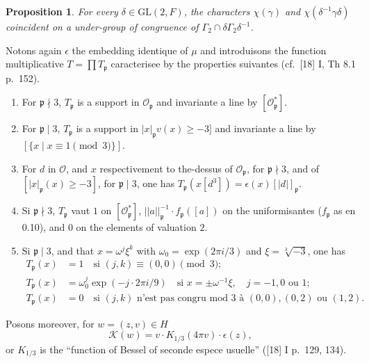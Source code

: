 \documentclass[12pt,a4paper]{article}
\theoremstyle{plain}
\newtheorem{proposition}[theorem]{Proposition}
\theoremstyle{definition}
\theoremstyle{remark}
\newcommand{\cO}{\mathcal{O}}
\newcommand{\frakp}{\mathfrak{p}}
\providecommand{\cO}{\mathcal{O}}
\providecommand{\frakp}{\mathfrak{p}}
\begin{document}
\begin{proposition}
For every $\delta \in \mathrm{GL}(2, F)$, the characters $\chi(\gamma)$ and $\chi(\delta^{-1}\gamma\delta)$ coincident on a under-group of congruence of $\Gamma_2 \cap \delta\Gamma_2\delta^{-1}$.
\end{proposition}

Notons again $\epsilon$ the embedding identique of $\mu$ and introduisons the function multiplicative $T = \prod T_\frakp$ caracterisee by the properties suivantes (cf.\ [18] I, Th 8.1 p.~152).
\begin{enumerate}[label=(\alph*)]
\item For $\frakp \nmid 3$, $T_\frakp$ is a support in $\cO_\frakp$ and invariante a line by $[\cO_\frakp^*]$.
\item For $\frakp \mid 3$, $T_\frakp$ is a support in $|x|_\frakp v(x) \geq -3]$ and invariante a line by $[\{x \mid x \equiv 1 \pmod 3\}]$.
\item For $d$ in $\cO$, and $x$ respectivement to the-dessus of $\cO_\frakp$, for $\frakp \nmid 3$, and of $[|x|_\frakp(x) \geq -3]$, for $\frakp \mid 3$, one has $T_\frakp(x[d^3]) = \epsilon(x) [|d|]_\frakp$.
\item Si $\frakp \nmid 3$, $T_\frakp$ vaut $1$ on $[\cO_\frakp^*]$, $||a||_\frakp^{-1} \cdot f_\frakp([a])$ on the uniformisantes ($f_\frakp$ as en 0.10), and $0$ on the elements of valuation $2$.
\item Si $\frakp \mid 3$, and that $x = \omega^j \xi^k$ with $\omega_0 = \exp(2\pi i/3)$ and $\xi = \sqrt[3]{-3}$, one has
\begin{align*}
T_\frakp(x) &= 1 \quad \text{si } (j, k) \equiv (0, 0) \pmod 3;\\
T_\frakp(x) &= \omega_0^j \exp(-j \cdot 2\pi i/9) \quad \text{si } x = \pm \omega^{-1} \xi, \quad j = -1, 0 \text{ ou } 1;\\
T_\frakp(x) &= 0 \quad \text{si } (j, k) \text{ n'est pas congru mod } 3 \text{ à } (0, 0), (0, 2) \text{ ou } (1, 2).
\end{align*}
\end{enumerate}

Posons moreover, for $w = (z, v) \in H$
\[
\mathcal{K}(w) = v \cdot K_{1/3}(4\pi v) \cdot \epsilon(z),
\]
or $K_{1/3}$ is the ``function of Bessel of seconde espece usuelle'' ([18] I p.~129, 134).
\end{document}
